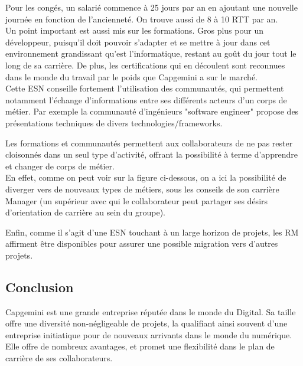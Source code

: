 \documentclass{rapport}
\begin{document}
Pour les congés, un salarié commence à 25 jours par an en ajoutant une nouvelle journée en fonction de l'ancienneté. On trouve aussi de 8 à 10 RTT par an.\\

Un point important est aussi mis sur les formations. Gros plus pour un développeur, puisqu'il doit pouvoir s'adapter et se mettre à jour dans cet environnement grandissant qu'est l'informatique, restant au goût du jour tout le long de sa carrière. De plus, les certifications qui en découlent sont reconnues dans le monde du travail par le poids que Capgemini a sur le marché.\\

Cette ESN conseille fortement l'utilisation des communautés, qui permettent notamment l'échange d'informations entre ses différents acteurs d'un corps de métier. Par exemple la communauté d'ingénieurs "software engineer" propose des présentations techniques de divers technologies/frameworks.

Les formations et communautés permettent aux collaborateurs de ne pas rester cloisonnés dans un seul type d'activité, offrant la possibilité à terme d'apprendre et changer de corps de métier.\\

En effet, comme on peut voir sur la figure ci-dessous, on a ici la possibilité de diverger vers de nouveaux types de métiers, sous les conseils de son carrière Manager (un supérieur avec qui le collaborateur peut partager ses désirs d'orientation de carrière au sein du groupe).\\


Enfin, comme il s'agit d'une ESN touchant à un large horizon de projets, les RM affirment être disponibles pour assurer une possible migration vers d'autres projets. 

\subsection*{Conclusion}

Capgemini est une grande entreprise réputée dans le monde du Digital. Sa taille offre une diversité non-négligeable de projets, la qualifiant ainsi souvent d'une entreprise initiatique pour de nouveaux arrivants dans le monde du numérique.
Elle offre de nombreux avantages, et promet une flexibilité dans le plan de carrière de ses collaborateurs.
\end{document}
